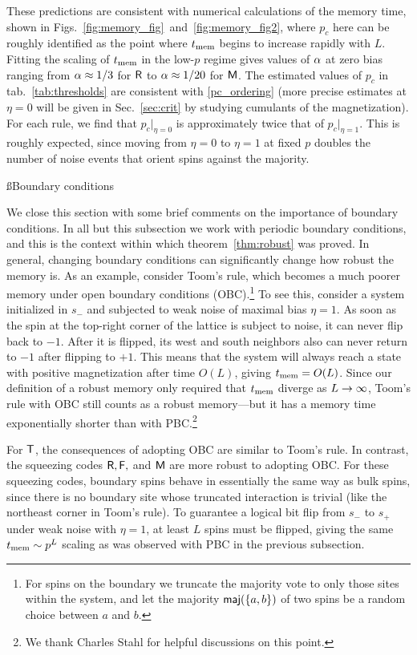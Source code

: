 \documentclass[pra,aps,twocolumn,groupedaddress,superscriptaddress,nofootinbib,preprintnumbers]{revtex4-2}
\begin{document}
	These predictions are consistent with numerical calculations of the memory time, shown in Figs.~\ref{fig:memory_fig}~and~\ref{fig:memory_fig2},  where $p_c$ here can be roughly identified as the point where $t_{\rm mem}$ begins to increase rapidly with $L$. Fitting the scaling of $t_{\rm mem}$ in the low-$p$ regime gives values of $\alpha$ at zero bias ranging from $\alpha\approx 1/3$ for $\mathsf{R}$ to $\alpha\approx 1/20$ for $\mathsf{M}$. The estimated values of $p_c$  in tab.~\ref{tab:thresholds} are consistent with \eqref{pc_ordering} (more precise estimates at $\eta=0$ will be given in Sec.~\ref{sec:crit} by studying cumulants of the magnetization). For each rule, we find that $p_c|_{\eta = 0}$ is approximately twice that of $p_c|_{\eta =1}$. This is roughly expected, since moving from $\eta = 0$ to $\eta=1$ at fixed $p$ doubles the number of noise events that orient spins against the majority. 
	
	\ss{Boundary conditions} 
	
	We close this section with some brief comments on the importance of boundary conditions. In all but this subsection we work with periodic boundary conditions, and this is the context within which theorem~\ref{thm:robust} was proved. In general, changing boundary conditions can significantly change how robust the memory is. As an example, consider Toom's rule, which becomes a much poorer memory under open boundary conditions (OBC).\footnote{For spins on the boundary we truncate the majority vote to only those sites within the system, and let the majority ${\sf maj}(\{a,b\})$ of two spins be a random choice between $a$ and $b$. } To see this, consider a system initialized in $s_-$ and subjected to weak noise of maximal bias $\eta=1$. As soon as the spin at the top-right corner of the lattice is subject to noise, it can never flip back to $-1$. After it is flipped, its west and south neighbors also can never return to $-1$ after flipping to $+1$. This means that the system will always reach a state with positive magnetization after time $O(L)$, giving $t_{\rm mem} = O(L)$. Since our definition of a robust memory only required that $t_{\rm mem}$ diverge as $L\rightarrow\infty$, Toom's rule with OBC still counts as a robust memory---but it has a memory time exponentially shorter than with PBC.\footnote{We thank Charles Stahl for helpful discussions on this point.}
	
	For $\mathsf{T}$, the consequences of adopting OBC are similar to Toom's rule. In contrast, the squeezing codes $\mathsf{R},\mathsf{F},$ and $\mathsf{M}$ are more robust to adopting OBC. For these squeezing codes, boundary spins behave in essentially the same way as bulk spins, since there is no boundary site whose truncated interaction is trivial (like the northeast corner in Toom's rule). To guarantee a logical bit flip from $s_-$ to $s_+$ under weak noise with $\eta=1$, at least $L$ spins must be flipped, giving the same $t_{\rm mem} \sim p^L$ scaling as was observed with PBC in the previous subsection.
	
\end{document}
